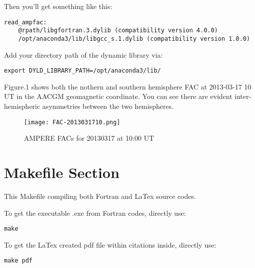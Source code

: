 \documentclass[12pt, letterpaper]{article} %
\begin{document}
\noindent Then you'll get something like this:

\begin{verbatim}
read_ampfac:
	@rpath/libgfortran.3.dylib (compatibility version 4.0.0)
	/opt/anaconda3/lib/libgcc_s.1.dylib (compatibility version 1.0.0)
\end{verbatim} %

\noindent Add your directory path of the dynamic library via:

\begin{verbatim}
export DYLD_LIBRARY_PATH=/opt/anaconda3/lib/
\end{verbatim} %



\noindent Figure.1 shows both the nothern and southern hemisphere FAC at 2013-03-17 10 UT in the AACGM geomagnetic coordinate. You can see there are evident inter-hemispheric asymmetries between the two hemispheres.

\begin{figure}[!t] %
\begin{center} %
  \texttt{[image: FAC-2013031710.png]}
  \caption{AMPERE FACs for 20130317 at 10:00 UT}
  \label{fig:1}
\end{center} %
\end{figure} %


\section{Makefile Section} %

\noindent This Makefile compiling both Fortran and LaTex source codes. 

\noindent To get the executable .exe from Fortran codes, directly use:
\begin{verbatim}
make 
\end{verbatim} %


\noindent To get the LaTex created pdf file within citations inside, directly use:
\begin{verbatim}
make pdf
\end{verbatim} %
\end{document}
